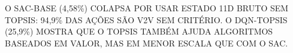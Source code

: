 \documentclass{beamer}
\begin{document}
{\begin{frame}[plain, t]
\vspace{0.18cm}
\hspace{0.3cm}
\begin{minipage}{0.92\textwidth}
{\scriptsize\ttfamily\setlength{\baselineskip}{1.5\baselineskip}
O SAC-BASE (4,58\%) COLAPSA POR USAR ESTADO 11D BRUTO SEM TOPSIS:
94,9\% DAS AÇÕES SÃO V2V SEM CRITÉRIO. O DQN-TOPSIS (25,9\%) MOSTRA
QUE O TOPSIS TAMBÉM AJUDA ALGORITMOS BASEADOS EM VALOR, MAS EM
MENOR ESCALA QUE COM O SAC.
}
\end{minipage}

\end{frame}
}





\end{document}
